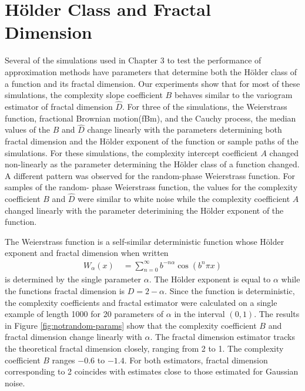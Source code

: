 \section{H\"older Class and Fractal Dimension}



Several of the simulations used in Chapter 3 to test the 
performance of approximation methods have  parameters that 
determine both the H\"older class of a function and its 
fractal dimension. Our experiments show that for most 
of these simulations, the complexity slope coefficient 
$B$ behaves similar to the variogram estimator of
fractal dimension $\hat D$. For three of the simulations, 
the Weierstrass function, fractional Brownian motion(fBm), 
and the Cauchy process, the median values of the 
$B$ and $\hat D$ change linearly with the parameters 
determining both fractal dimension and the H\"older 
exponent of the function or sample paths of the simulations.
For these simulations, the complexity intercept coefficient $A$
changed non-linearly as the parameter determining the 
H\"older class of a function changed. A different 
pattern was observed for the random-phase
Weierstrass function. For samples of the random- 
phase Weierstrass function, the values for the 
complexity coefficient $B$ and $\hat D$ were similar 
to white noise while the complexity
coefficient $A$ changed linearly with the parameter 
deterimining the H\"older exponent of the function.


The Weierstrass function is a self-similar 
deterministic function 
whose H\"older exponent and fractal dimension when 
written
\begin{align}
      W_{\alpha}(x) 
  \hspace{1em}= \sum_{n = 0}^{\infty} b^{-n \alpha} \cos(b^n \pi x)
\end{align}
is determined by the single parameter $\alpha$. The 
H\"older exponent is equal to $\alpha$ while the functions
fractal dimension is $D = 2 - \alpha$. 
Since the function is deterministic, the complexity 
coefficients and fractal estimator were calculated 
on a single example of length 1000 for 20 parameters 
of $\alpha$ in the interval $(0,1)$. The results 
in Figure \ref{fig:notrandom-params}  
show that the complexity coefficient $B$ and fractal dimension
change linearly with $\alpha$. The fractal dimension 
estimator tracks the theoretical fractal dimension 
closely, ranging from 2 to 1. The complexity coefficient 
$B$ ranges $-0.6$ to $-1.4$. For both estimators, fractal 
dimension corresponding to 2 coincides with estimates
close to those estimated for Gaussian noise.

